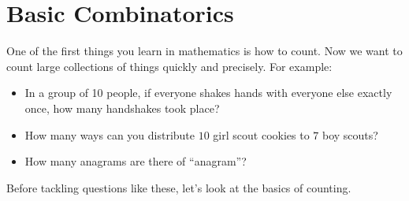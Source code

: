 \documentclass[10pt,]{book}
\theoremstyle{plain}
\theoremstyle{definition}
\theoremstyle{definition}
\theoremstyle{definition}
\numberwithin{equation}{chapter}
\begin{document}
\chapter[{Basic Combinatorics}]{Basic Combinatorics}\label{ch_basic-combinatorics}
\hypertarget{p-12}{}%
One of the first things you learn in mathematics is how to count. Now we want to count large collections of things quickly and precisely. For example: \leavevmode%
\begin{itemize}[label=\textbullet]
\item{}\hypertarget{p-13}{}%
In a group of 10 people, if everyone shakes hands with everyone else exactly once, how many handshakes took place?%
\item{}\hypertarget{p-14}{}%
How many ways can you distribute \(10\) girl scout cookies to \(7\) boy scouts?%
\item{}\hypertarget{p-15}{}%
How many anagrams are there of ``anagram''?%
\end{itemize}
%
\par
\hypertarget{p-16}{}%
Before tackling questions like these, let's look at the basics of counting.%
\typeout{************************************************}
\typeout{************************************************}
\end{document}
